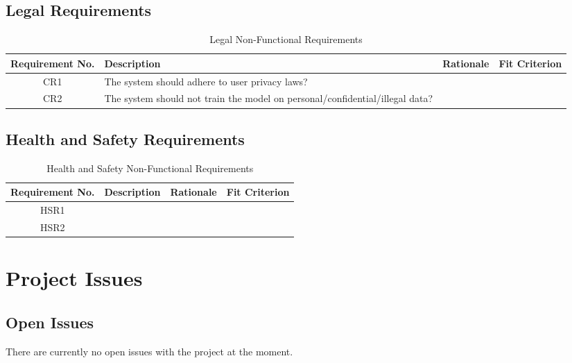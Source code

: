 \documentclass[12pt, titlepage]{article}
\begin{document}
\subsection{Legal Requirements}

\begin{table}[H]
\caption{Legal Non-Functional Requirements}
\noindent \begin{tabular}{| c | p{3cm}| p{3cm}| p{3cm}|}
\toprule 
\textbf{Requirement No.} & \textbf{Description} & \textbf{Rationale} & \textbf{Fit Criterion}\\
\midrule
CR1 & The system should adhere to user privacy laws?  & & \\
\hline
CR2 & The system should not train the model on personal/confidential/illegal data? & & \\
\bottomrule
\end{tabular}
\end{table}

\subsection{Health and Safety Requirements}

\begin{table}[H]
\caption{Health and Safety Non-Functional Requirements}
\noindent \begin{tabular}{| c | p{3cm}| p{3cm}| p{3cm}|}
\toprule 
\textbf{Requirement No.} & \textbf{Description} & \textbf{Rationale} & \textbf{Fit Criterion}\\
\midrule
HSR1 &  & & \\
\hline
HSR2 & & & \\
\bottomrule
\end{tabular}
\end{table}

\section{Project Issues}

\subsection{Open Issues}
There are currently no open issues with the project at the moment.
\end{document}

